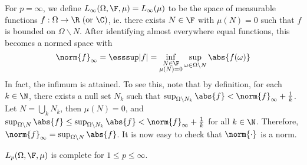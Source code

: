 \documentclass[a4paper]{article}
\begin{document}
For $p=\infty$, we define $L_\infty(\Omega,\F,\mu)=L_\infty(\mu)$ to be the space of  measurable functions $f:\Omega\to\R\ (\text{or }\C)$, ie. there exists $N\in\F$ with $\mu(N)=0$ such that $f$ is bounded on $\Omega\backslash N$. After identifying almost everywhere equal functions, this becomes a normed space with
\[
  \norm{f}_\infty=\esssup|f|=\inf_{\substack{N\in\F \\ \mu(N)=0}}\sup_{\omega\in\Omega\backslash N}\abs{f(\omega)}
\]
In fact, the infimum is attained. To see this, note that by definition, for each $k\in\N$, there exists a null set $N_k$ such that $\sup_{\Omega\backslash N_k}\abs{f}<\norm{f}_\infty+\frac{1}{k}$. Let $N=\bigcup_k N_k$, then $\mu(N)=0$, and $\sup_{\Omega\backslash N}\abs{f}\leq\sup_{\Omega\backslash N_k}\abs{f}<\norm{f}_\infty+\frac{1}{k}$ for all $k\in\N$. Therefore, $\norm{f}_\infty=\sup_{\Omega\backslash N}\abs{f}$. It is now easy to check that $\norm{\cdot}$ is a norm.

\begin{nthm}\label{thm:LpComplete}
  $L_p(\Omega,\F,\mu)$ is complete for $1\leq p\leq\infty$.
\end{nthm}
\end{document}
